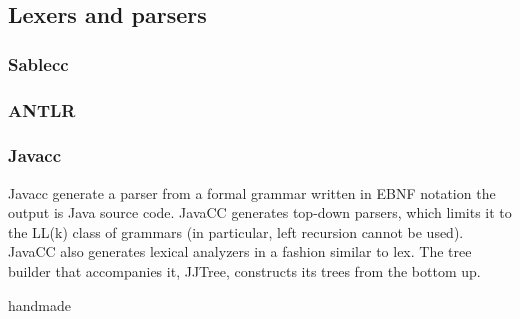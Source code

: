 \subsection{Lexers and parsers}


\subsubsection{Sablecc}


\subsubsection{ANTLR}


\subsubsection{Javacc}
Javacc generate a parser from a formal grammar written in EBNF notation the output is Java source code. JavaCC generates top-down parsers, which limits it to the LL(k) class of grammars (in particular, left recursion cannot be used). JavaCC also generates lexical analyzers in a fashion similar to lex. The tree builder that accompanies it, JJTree, constructs its trees from the bottom up.




handmade